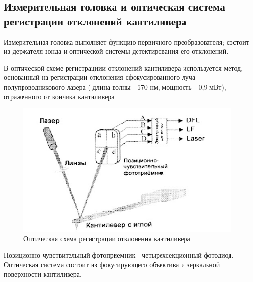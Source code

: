 \documentclass[a4paper,12pt]{article}
\theoremstyle{plain} %
\theoremstyle{definition} %
\theoremstyle{remark} %
\begin{document}
\subsection{Измерительная головка и оптическая система регистрации отклонений кантиливера }
Измерительная головка выполняет функцию первичного преобразователя; состоит из держателя зонда и оптической системы детектирования его отклонений.


В оптической схеме регистрациии отклонений кантиливера используется метод, основанный на регистрации отклонения сфокусированного луча полупроводникового лазера ( длина волны - 670 нм, мощность - 0,9 мВт), отраженного от кончика кантиливера. 
\begin{figure}[H]
	\centering
	\includegraphics[scale=0.6]{pic5.jpg}
	\caption{ Оптическая схема регистрации отклонения кантиливера}
	\label{pic5}
\end{figure}
Позиционно-чувствительный фотоприемник - четырехсекционный фотодиод. Оптическая система состоит из фокусирующего объектива и зеркальной поверхности кантиливера. 
\end{document}
